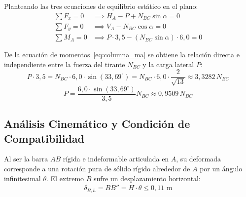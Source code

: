 Planteando las tres ecuaciones de equilibrio estático en el plano:
\begin{align}
    \sum F_x = 0 &\implies H_A - P + N_{BC} \sin\alpha = 0 \label{eq:columna_fx} \\
    \sum F_y = 0 &\implies V_A - N_{BC} \cos\alpha = 0 \label{eq:columna_fy} \\
    \sum M_A = 0 &\implies P \cdot 3{,}5 - (N_{BC} \sin\alpha) \cdot 6{,}0 = 0 \label{eq:columna_ma}
\end{align}

De la ecuación de momentos~\eqref{eq:columna_ma} se obtiene la relación directa e independiente entre la fuerza del tirante $N_{BC}$ y la carga lateral $P$:
\begin{equation}
    P \cdot 3{,}5 = N_{BC} \cdot 6{,}0 \cdot \sin(33{,}69^\circ) = N_{BC} \cdot 6{,}0 \cdot \frac{2}{\sqrt{13}} \approx 3{,}3282 \, N_{BC}
\end{equation}
\begin{equation}
    P = \frac{6{,}0 \cdot \sin(33{,}69^\circ)}{3{,}5} N_{BC} \approx 0{,}9509 \, N_{BC} \label{eq:relacion_p_nbc}
\end{equation}

\subsection{Análisis Cinemático y Condición de Compatibilidad}

Al ser la barra $AB$ rígida e indeformable articulada en $A$, su deformada corresponde a una rotación pura de sólido rígido alrededor de $A$ por un ángulo infinitesimal $\theta$.
El extremo $B$ sufre un desplazamiento horizontal:
\begin{equation}
    \delta_{B,h} = \overline{BB''} = H \cdot \theta \leq 0{,}11\text{ m}
\end{equation}

